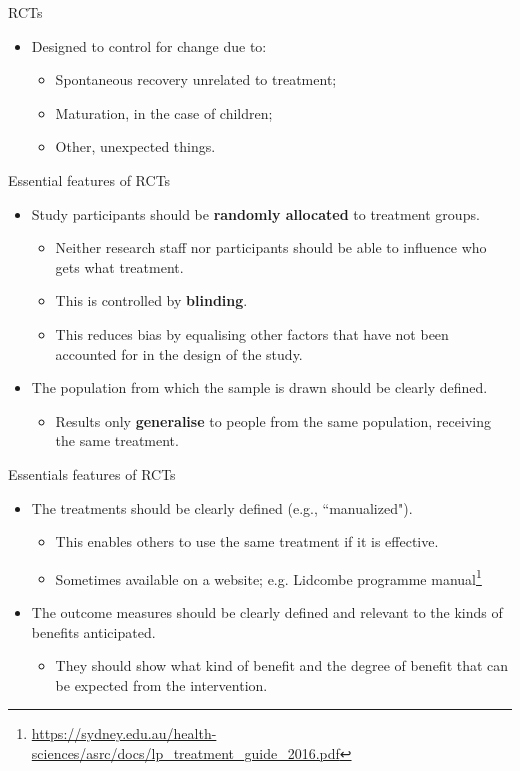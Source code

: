 \documentclass{beamer}
\begin{document}
% 
\begin{frame}{RCTs}
	\begin{itemize}
	\item Designed to control for change due to:
		\begin{itemize}
		\item Spontaneous recovery unrelated to treatment;
		\item Maturation, in the case of children;
		\item Other, unexpected things.
		\end{itemize}
	\end {itemize}
\end{frame}

% 
\begin{frame}{Essential features of RCTs}
	\begin{itemize}
	\item Study participants should be \textbf{randomly allocated} to treatment groups.
		\begin{itemize}
		\item Neither research staff nor participants should be able to influence who gets what treatment.
		\item This is controlled by \textbf{blinding}.
		\item This reduces bias by equalising other factors that have not been accounted for in the design of the study.
		\end{itemize}
	\item The population from which the sample is drawn should be clearly defined.
		\begin{itemize}
		\item Results only \textbf{generalise} to people from the same population, receiving the same treatment.
		\end{itemize}
	\end {itemize}
\end{frame}

% 
\begin{frame}{Essentials features of RCTs}
	\begin{itemize}
	\item The treatments should be clearly defined (e.g., ``manualized").
		\begin{itemize}
		\item This enables others to use the same treatment if it is effective.
		\item Sometimes available on a website; e.g. Lidcombe programme manual\footnote{\tiny{\url{https://sydney.edu.au/health-sciences/asrc/docs/lp_treatment_guide_2016.pdf}}}
		\end{itemize}
	\item The outcome measures should be clearly defined and relevant to the kinds of benefits anticipated.
		\begin{itemize}
		\item They should show what kind of benefit and the degree of benefit that can be expected from the intervention.
		\end {itemize}
	\end {itemize}
\end{frame}
\end{document}
